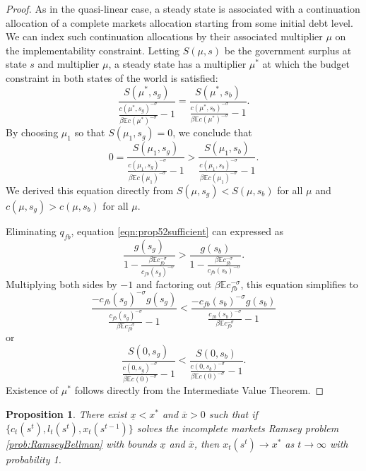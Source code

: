 \documentclass[12pt]{article}
\newcommand{\EE}{\mathbb E}
\newtheorem{proposition}[theorem]{Proposition}
\begin{document}
\begin{proof}As in the quasi-linear case, a steady state is associated with a continuation allocation of a complete markets allocation starting from  some initial debt level.  We can index such continuation allocations by their associated multiplier $\mu$ on the implementability constraint.  Letting $S(\mu,s)$ be the government surplus at state $s$ and multiplier $\mu$, a steady state has  a multiplier $\mu^*$ at which the budget constraint in both states of the world is satisfied:
\[
	\frac{S(\mu^*,s_g)}{\frac{c(\mu^*,s_g)^{-\sigma}}{\beta \EE c(\mu^*)^{-\sigma}}-1} =\frac{S(\mu^*,s_b)}{\frac{c(\mu^*,s_b)^{-\sigma}}{\beta \EE c(\mu^*)^{-\sigma}}-1}.
\]  By choosing $\mu_1$ so that $S(\mu_1,s_g) =0$, we conclude that
\[
	0 = \frac{S(\mu_1,s_g)}{\frac{c(\mu_1,s_g)^{-\sigma}}{\beta \EE c(\mu_1)^{-\sigma}}-1} > \frac{S(\mu_1,s_b)}{\frac{c(\mu_1,s_b)^{-\sigma}}{\beta \EE c(\mu_1)^{-\sigma}}-1}.
\]  We derived this equation directly from $S(\mu,s_g) < S(\mu,s_b)$ for all $\mu$ and $c(\mu,s_g) > c(\mu,s_b)$ for all $\mu$.

Eliminating  $q_{fb}$, equation \eqref{eqn:prop52sufficient} can expressed as
\[
	\frac{g(s_g)}{1-\frac{\beta\EE c_{fb}^{-\sigma}}{c_{fb}(s_g)^{-\sigma}}} > \frac{g(s_b)}{1-\frac{\beta\EE c_{fb}^{-\sigma}}{c_{fb}(s_b)^{-\sigma}}}.
\]  Multiplying both sides by $-1$ and factoring out  $\beta\EE c_{fb}^{-\sigma}$, this equation simplifies to
\[
	\frac{-c_{fb}(s_g)^{-\sigma}g(s_g) }{\frac{c_{fb}(s_g)^{-\sigma}}{\beta \EE c_{fb}^{-\sigma}}-1} < \frac{-c_{fb}(s_b)^{-\sigma}g(s_b) }{\frac{c_{fb}(s_b)^{-\sigma}}{\beta \EE c_{fb}^{-\sigma}}-1}
\]or
\[
	\frac{S(0,s_g)}{\frac{c(0,s_g)^{-\sigma}}{\beta \EE c(0)^{-\sigma}}-1} <\frac{S(0,s_b)}{\frac{c(0,s_b)^{-\sigma}}{\beta \EE c(0)^{-\sigma}}-1}.
\]  Existence of $\mu^*$ follows directly from the Intermediate Value Theorem.
\end{proof}


	\begin{proposition}\label{prop:convergenceU}
  There exist $\underline x < x^*$ and $\overline x >0$ such that if $\{c_t(s^t), l_t(s^t), x_t(s^{t-1})\}$ solves the incomplete markets Ramsey problem \ref{prob:RamseyBellman} with bounds $\underline x$ and $\overline x$, then $x_t(s^t)\rightarrow x^*$ as $t\rightarrow\infty$ with probability 1.
	
	\end{proposition}
\end{document}
